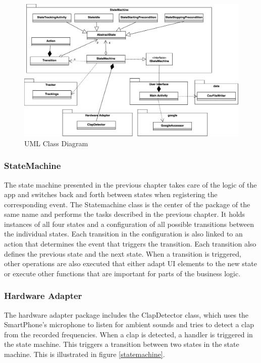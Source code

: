 \begin{figure}[H]
	\centering
	\includegraphics[width=1.0\linewidth]{./imgs/classUML.png}
	\caption{UML Class Diagram}
	\label{class-diagram}
\end{figure}

\subsubsection{StateMachine}
\label{sec:org9ea54c6}

The state machine presented in the previous chapter takes care of the logic 
of the app and switches back and forth between states when registering the corresponding event. 
The Statemachine class is the center of the package of the same name and performs the tasks described in the previous chapter.
It holds instances of all four states and a configuration of all possible transitions between the individual states.
Each transition in the configuration is also linked to an action that determines the event that triggers 
the transition. Each transition also defines the previous state and the next state.
When a transition is triggered, other operations are also executed that either adapt UI elements to the new 
state or execute other functions that are important for parts of the business logic.

\subsubsection{Hardware Adapter}
\label{sec:org0a1c43f}
The hardware adapter package includes the ClapDetector class, which uses the SmartPhone's microphone to listen 
for ambient sounds and tries to detect a clap from the recorded frequencies. When a clap is detected, 
a handler is triggered in the state machine. This triggers a transition between two states in the state machine.
This is illustrated in figure \ref{statemachine}.

